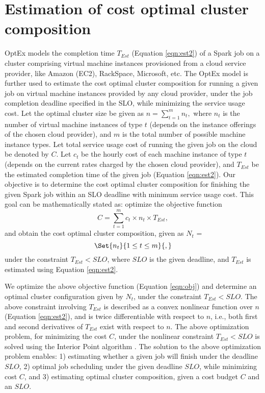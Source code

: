 \documentclass[conference]{IEEEtran}
\begin{document}
\section{Estimation of cost optimal cluster composition}\label{sec:cost}


OptEx models the completion time $T_{\mathit{Est}}$ (Equation
\ref{eqn:est2}) of a Spark job on a cluster comprising virtual machine instances provisioned
 from a cloud service provider, like Amazon (EC2), RackSpace, Microsoft, etc. The OptEx model is further used to estimate the cost optimal cluster composition for running a given job on
  virtual machine instances provided by any cloud provider, under
the job completion deadline specified in the SLO, while minimizing the service usage cost.
 Let the optimal cluster size be given as $n = \sum_{t=1}^m {\mathit{n_t}},$
 where $n_t$ is the number of virtual machine instances of type $t$ (depends on the instance offerings of the chosen cloud provider), and  $m$ is the total number of possible machine instance types.
Let total service usage cost of running the given job on the cloud be denoted by $C$.
Let $\mathit{c_{t}}$ be the hourly cost of each
 machine instance of type $t$ (depends on the current rates charged by the chosen cloud provider), and $\mathit{T_{\mathit{Est}}}$ be the estimated
 completion time of the given job (Equation \ref{eqn:est2}).
   Our objective is to determine the
 cost optimal cluster composition for finishing the given Spark job within an SLO deadline with minimum service usage cost.
  This goal can be mathematically stated as: optimize the objective function
\begin{equation}\label{eqn:obj}
 C = \sum_{t=1}^{m} \mathit{c_{t}} \times \mathit{n_{t}} \times \mathit{T_{\mathit{Est}}},
\end{equation}
and  obtain the cost optimal cluster composition, given as $\mathit{N_t}$ = \[ \Set{n_t} {1\le t\le m}{,} \] under
the constraint $\mathit{T_{\mathit{Est}}} < \mathit{SLO}$, where $\mathit{SLO}$ is the given deadline, and
 $T_{Est}$ is estimated using Equation \ref{eqn:est2}.
\par We optimize the above objective function (Equation \ref{eqn:obj}) and determine an optimal cluster configuration given by $\mathit{N_t}$, under the constraint $\mathit{T_{\mathit{Est}}} < \mathit{SLO}.$
The above constraint involving $\mathit{T_{\mathit{Est}}}$ is described as a convex  nonlinear function over $n$ (Equation
\ref{eqn:est2}), and is twice differentiable with
respect to $n$, i.e., both first and second derivatives of $\mathit{T_{\mathit{Est}}}$ exist with respect to $n$.
The above optimization problem, for minimizing the cost $C$, under the nonlinear constraint $\mathit{T_{\mathit{Est}}} < \mathit{SLO}$ is solved using the Interior Point algorithm \cite{leader2004numerical}.
 The solution to the
above optimization problem enables: 1) estimating whether a
given job will finish under the deadline $\mathit{SLO}$, 2) optimal job
scheduling under the given deadline $\mathit{SLO}$, while minimizing
cost $C$, and 3) estimating optimal cluster
composition, given a cost budget $C$ and an $\mathit{SLO}$.  
\end{document}
